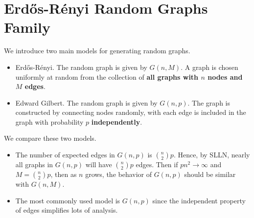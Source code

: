 \section{Erdős-Rényi Random Graphs Family}
We introduce two main models for generating random graphs.
\begin{itemize}
	\item Erdős-Rényi. The random graph is given by \(G(n, M)\). A graph is chosen uniformly at random from the collection of \textbf{all graphs with \(n\) nodes and \(M\) edges}.
	\item Edward Gilbert. The random graph is given by \(G(n, p)\). The graph is constructed by connecting nodes randomly, with each edge is included in the graph with probability \(p\) \textbf{independently}.
\end{itemize}

\begin{remark}
	We compare these two models.
	\begin{itemize}
		\item The number of expected edges in \(G(n, p)\) is \(\binom{n}{2}p\). Hence, by SLLN, nearly all graphs in \(G(n, p)\) will have \(\binom{n}{2}p\) edges. Then if
		      \(pn^{2} \to \infty \) and \(M = \binom{n}{2}p\), then as \(n\) grows, the behavior of \(G(n, p)\) should be similar with \(G(n, M)\).
		\item The most commonly used model is \(G(n, p)\) since the independent property of edges simplifies lots of analysis.
	\end{itemize}
\end{remark}

\hr

